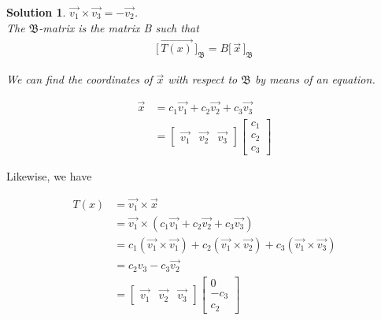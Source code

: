\documentclass{article}
\newtheorem*{solution}{Solution}
\newcommand{\Coord}[2]{\Bigg[ \, \vec{#1} \, \Bigg]_{\mathfrak{#2}}}
\begin{document}
\begin{solution}
$\vec{v_{1}} \times \vec{v_{3}} = -\vec{v_{2}}$. \\

The $\mathfrak{B}$-matrix is the matrix B such that \\

\begin{align*}
\Coord{T(x)}{B} = B \Coord{x}{B}
\end{align*}


We can find the coordinates of $\vec{x}$ with respect to $\mathfrak{B}$ by means of an equation.

\begin{align*}
\vec{x} &= c_{1} \vec{v_{1}} + c_{2} \vec{v_{2}} + c_{3} \vec{v_{3}} \\
&= \begin{bmatrix} \vec{v_{1}} & \vec{v_{2}} & \vec{v_{3}} \end{bmatrix} \begin{bmatrix} c_{1} \\ c_{2} \\ c_{3} \end{bmatrix}
\end{align*}
\end{solution}

Likewise, we have

\begin{align*}
T(x) &= \vec{v_{1}} \times \vec{x} \\
&= \vec{v_{1}} \times (c_{1} \vec{v_{1}} + c_{2} \vec{v_{2}} + c_{3} \vec{v_{3}}) \\
&= c_{1} (\vec{v_{1}} \times \vec{v_{1}}) + c_{2} (\vec{v_{1}} \times \vec{v_{2}}) + c_{3} (\vec{v_{1}} \times \vec{v_{3}}) \\
&= c_{2} v_{3} - c_{3} \vec{v_{2}} \\
&= \begin{bmatrix} \vec{v_{1}} & \vec{v_{2}} & \vec{v_{3}} \end{bmatrix} \begin{bmatrix} 0 \\ -c_{3} \\ c_{2} \end{bmatrix}
\end{align*}
\end{document}
